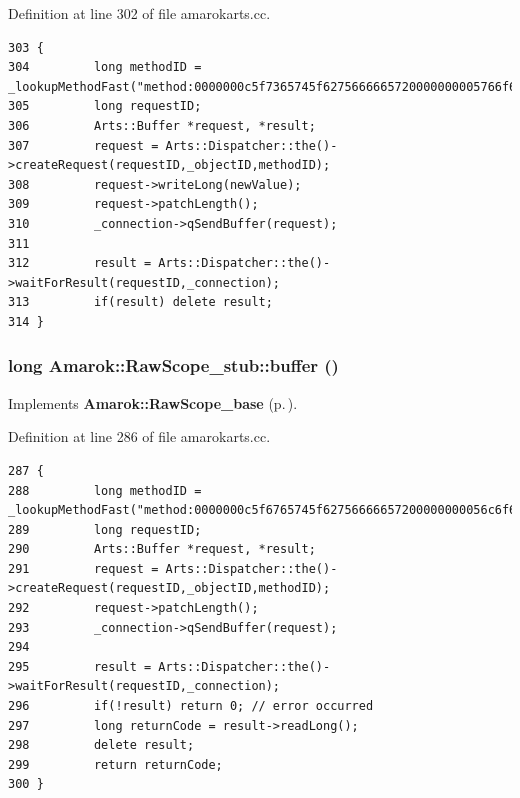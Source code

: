 Definition at line 302 of file amarokarts.cc.



\footnotesize\begin{verbatim}303 {
304         long methodID = _lookupMethodFast("method:0000000c5f7365745f6275666665720000000005766f6964000000000200000001000000056c6f6e6700000000096e657756616c7565000000000000000000");
305         long requestID;
306         Arts::Buffer *request, *result;
307         request = Arts::Dispatcher::the()->createRequest(requestID,_objectID,methodID);
308         request->writeLong(newValue);
309         request->patchLength();
310         _connection->qSendBuffer(request);
311 
312         result = Arts::Dispatcher::the()->waitForResult(requestID,_connection);
313         if(result) delete result;
314 }
\end{verbatim}\normalsize 
{}
\subsubsection{\setlength{\rightskip}{0pt plus 5cm}long Amarok::Raw\-Scope\_\-stub::buffer ()\hspace{0.3cm}{\tt  [virtual]}}\label{classAmarok_1_1RawScope__stub_Amarok_1_1RawScope__stuba1}




Implements {\bf Amarok::Raw\-Scope\_\-base} {\rm (p.\,\pageref{classAmarok_1_1RawScope__base_Amarok_1_1RawScope__skela9})}.

Definition at line 286 of file amarokarts.cc.



\footnotesize\begin{verbatim}287 {
288         long methodID = _lookupMethodFast("method:0000000c5f6765745f62756666657200000000056c6f6e6700000000020000000000000000");
289         long requestID;
290         Arts::Buffer *request, *result;
291         request = Arts::Dispatcher::the()->createRequest(requestID,_objectID,methodID);
292         request->patchLength();
293         _connection->qSendBuffer(request);
294 
295         result = Arts::Dispatcher::the()->waitForResult(requestID,_connection);
296         if(!result) return 0; // error occurred
297         long returnCode = result->readLong();
298         delete result;
299         return returnCode;
300 }
\end{verbatim}\normalsize 
{}
